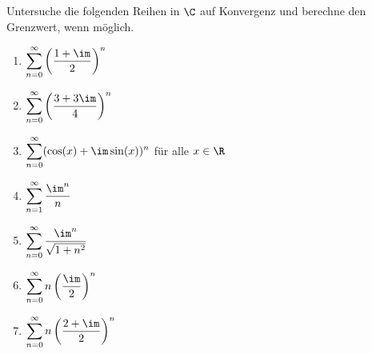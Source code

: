 \begin{prob}
  Untersuche die folgenden Reihen in $\C$ auf Konvergenz und berechne den
  Grenzwert, wenn möglich.
  \begin{enumerate}[label=(\alph*)]
  \item $\displaystyle \sum_{n=0}^\infty \left( \frac{1+\im}{2} \right)^n$
  \item $\displaystyle \sum_{n=0}^\infty \left( \frac{3+3\im}{4} \right)^n$
  \item $\displaystyle \sum_{n=0}^\infty (\cos(x) + \im\sin(x))^n$ für alle $x \in \R$
  \item $\displaystyle \sum_{n=1}^\infty \frac{\im^n}{n}$
  \item $\displaystyle \sum_{n=0}^\infty \frac{\im^n}{\sqrt{1+n^2}}$
  \item $\displaystyle \sum_{n=0}^\infty n \left( \frac{\im}{2} \right)^n$
  \item $\displaystyle \sum_{n=0}^\infty n \left( \frac{2 + \im}{2} \right)^n$
  \end{enumerate}
\end{prob}
